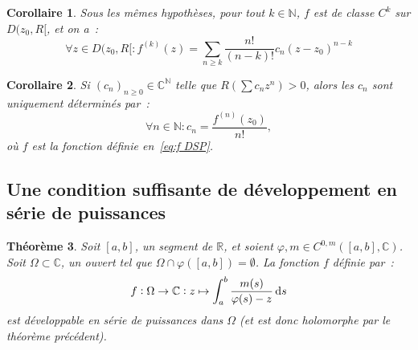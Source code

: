 \documentclass{report}
\newtheorem{thm}{Théorème}[chapter]
\newtheorem{cor}[thm]{Corollaire}
\theoremstyle{definition}
\theoremstyle{remark}
\numberwithin{equation}{section}
\newcommand{\C}{\mathbb C}
\newcommand{\R}{\mathbb R}
\newcommand{\N}{\mathbb N}
\begin{document}
			\begin{cor} Sous les mêmes hypothèses, pour tout $k \in \N$, $f$ est de classe $C^k$ sur $D(z_0, R[$, et on a~:
			\begin{equation}
				\forall z \in D(z_0, R[ : f^{(k)}(z) = \sum_{n \geq k}\frac {n!}{(n-k)!}c_n(z-z_0)^{n-k}
			\end{equation}
			\end{cor}

			\begin{cor} Si $(c_n)_{n \geq 0} \in \C^\N$ telle que $R\left(\sum c_nz^n\right) > 0$, alors les $c_n$ sont uniquement déterminés par~:
			\begin{equation}
				\forall n \in \N : c_n = \frac {f^{(n)}(z_0)}{n!},
			\end{equation}
			où $f$ est la fonction définie en~\eqref{eq:f DSP}.
			\end{cor}

		\subsection{Une condition suffisante de développement en série de puissances}
			\begin{thm}\label{thm:frac C0m DSP} Soit $[a, b]$, un segment de $\R$, et soient $\varphi, m \in C^{0,m}([a, b], \C)$. Soit $\Omega \subset \C$, un ouvert tel que
			$\Omega \cap \varphi([a, b]) = \emptyset$. La fonction $f$ définie par~:
			\begin{equation}
				f : \Omega \to \C : z \mapsto \int_a^b\frac {m(s)}{\varphi(s) - z}\dif s
			\end{equation}
			est développable en série de puissances dans $\Omega$ (et est donc holomorphe par le théorème précédent).
			\end{thm}
\end{document}
